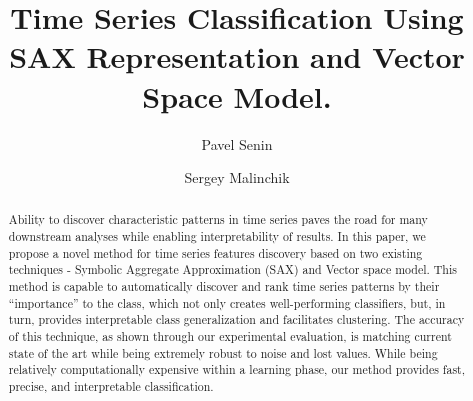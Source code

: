 \documentclass{llncs}
\begin{document}
%
\mainmatter              %
%
\title{Time Series Classification Using SAX Representation and Vector Space Model.}
%
%
\author{Pavel Senin
\and Sergey Malinchik
}
%
%
%


\maketitle              %

\begin{abstract}
Ability to discover characteristic patterns in time series paves the road for many downstream
analyses while enabling interpretability of results. 
In this paper, we propose a novel method for time series features discovery based on two existing
techniques - Symbolic Aggregate Approximation (SAX) and Vector space model. 
This method is capable to automatically discover and rank time series patterns by their “importance” 
to the class, which not only creates well-performing classifiers, but, in turn, provides interpretable
class generalization and facilitates clustering. The accuracy of this technique, as shown  through
our experimental evaluation, is matching current state of the art while being extremely robust to
noise and lost values.  
While being relatively computationally expensive within a learning phase, our method provides fast,
precise, and interpretable classification.
\end{abstract}
%
\end{document}
